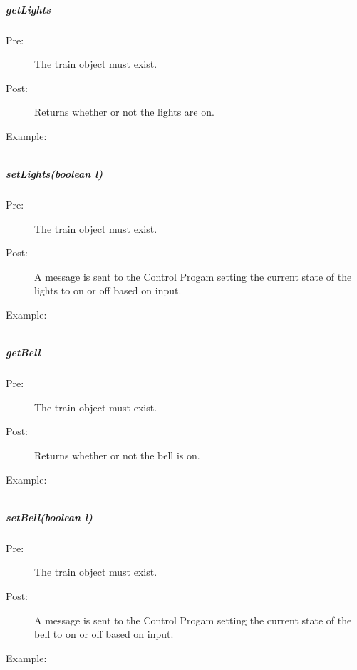 \documentclass[a4paper,11pt,notitlepage]{article}
\def\CS{Control Progam\xspace} \def\LC{Local Copy of Train State\xspace} \def\TN{Track Node\xspace}
\begin{document}
\subparagraph{getLights}
\begin{description}
\item[\hspace{1cm}Pre:] The train object must exist. 
\item[\hspace{1cm}Post:] Returns whether or not the lights are on.
\item[\hspace{1cm}Example:]
\begin{verbatim}

\end{verbatim}
\end{description}

\subparagraph{setLights(boolean l)} 
\begin{description}
\item[\hspace{1cm}Pre:] The train object must exist. 
\item[\hspace{1cm}Post:] A message is sent to the \CS setting the current state of the lights to on or off based on input.
\item[\hspace{1cm}Example:]
\begin{verbatim}

\end{verbatim}
\end{description}

\subparagraph{getBell} 
\begin{description}
\item[\hspace{1cm}Pre:] The train object must exist. 
\item[\hspace{1cm}Post:] Returns whether or not the bell is on.
\item[\hspace{1cm}Example:]
\begin{verbatim}

\end{verbatim}
\end{description}

\subparagraph{setBell(boolean l)} 
\begin{description}
\item[\hspace{1cm}Pre:] The train object must exist. 
\item[\hspace{1cm}Post:] A message is sent to the \CS setting the current state of the bell to on or off based on input.
\item[\hspace{1cm}Example:]
\begin{verbatim}

\end{verbatim}
\end{description}
\end{document}
